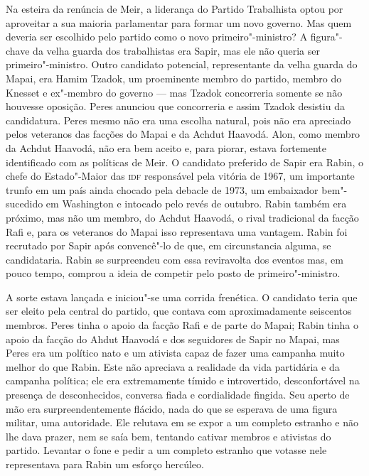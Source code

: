 Na esteira da renúncia de Meir, a liderança do Partido Trabalhista optou
por aproveitar a sua maioria parlamentar para formar um novo governo.
Mas quem deveria ser escolhido pelo partido como o novo primeiro"-ministro?
A figura"-chave da velha guarda dos trabalhistas era Sapir, mas
ele não queria ser primeiro"-ministro. Outro candidato potencial,
representante da velha guarda do Mapai, era Hamim Tzadok, um proeminente
membro do partido, membro do Knesset e ex"-membro do governo
--- mas Tzadok concorreria somente se não houvesse oposição. Peres
anunciou que concorreria e assim Tzadok desistiu da candidatura. Peres
mesmo não era uma escolha natural, pois não era apreciado pelos
veteranos das facções do Mapai e da Achdut Haavodá. Alon, como membro da
Achdut Haavodá, não era bem aceito e, para piorar, estava fortemente
identificado com as políticas de Meir. O candidato preferido de Sapir
era Rabin, o chefe do Estado"-Maior das \textsc{idf} responsável pela vitória de
1967, um importante trunfo em um país ainda chocado pela debacle de
1973, um embaixador bem"-sucedido em Washington e intocado pelo revés de
outubro. Rabin também era próximo, mas não um membro, do Achdut Haavodá,
o rival tradicional da facção Rafi e, para os veteranos do Mapai isso
representava uma vantagem. Rabin foi recrutado por Sapir após
convencê"-lo de que, em circunstancia alguma, se candidataria. Rabin se
surpreendeu com essa reviravolta dos eventos mas, em pouco tempo,
comprou a ideia de competir pelo posto de primeiro"-ministro.

A sorte estava lançada e iniciou"-se uma corrida frenética. O candidato
teria que ser eleito pela central do partido, que contava com
aproximadamente seiscentos membros. Peres tinha o apoio da facção Rafi e
de parte do Mapai; Rabin tinha o apoio da facção do Ahdut Haavodá e dos
seguidores de Sapir no Mapai, mas Peres era um político nato e um
ativista capaz de fazer uma campanha muito melhor do que Rabin. Este não
apreciava a realidade da vida partidária e da campanha política; ele era
extremamente tímido e introvertido, desconfortável na presença de
desconhecidos, conversa fiada e cordialidade fingida. Seu aperto de mão
era surpreendentemente flácido, nada do que se esperava de uma figura
militar, uma autoridade. Ele relutava em se expor a um completo estranho
e não lhe dava prazer, nem se saía bem, tentando cativar membros e
ativistas do partido. Levantar o fone e pedir a um completo estranho que
votasse nele representava para Rabin um esforço hercúleo.

